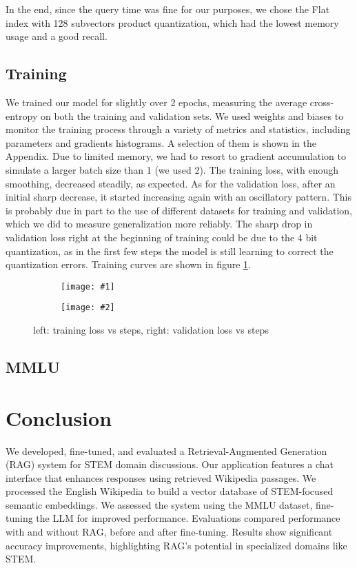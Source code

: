 \documentclass[11pt]{article}
\newcommand{\sideBySideImages}[5]{%
    \begin{figure}[ht]
        \centering
        \begin{subfigure}{#3\linewidth}
            \centering
            \texttt{[image: \#1]}
        \end{subfigure}%
        \hfill%
        \begin{subfigure}{#3\linewidth}
            \centering
            \texttt{[image: \#2]}
        \end{subfigure}
        \caption{#5}
        \label{#4}
    \end{figure}
}
\begin{document}
In the end, since the query time was fine for our purposes, we chose the Flat index with 128
subvectors product quantization, which had the lowest memory usage and a good recall.

\subsection{Training}

We trained our model for slightly over 2 epochs, measuring the average cross-entropy on both the training and validation sets. We used weights
and biases to monitor the training process through a variety of metrics and statistics, including parameters and gradients histograms. A selection of them 
is shown in the Appendix.
Due to limited memory, we had to resort to gradient accumulation to simulate a larger batch size than 1 (we used 2). The training loss, 
with enough smoothing, decreased steadily, as expected. As for the validation loss, after an initial sharp decrease, it started increasing
again with an oscillatory pattern. This is probably due in part to the use of different datasets for training and validation, which we did
to measure generalization more reliably. The sharp drop in validation loss right at the beginning of training could be due to the 4 bit quantization,
as in the first few steps the model is still learning to correct the quantization errors. Training curves are shown in figure \ref{fig:training_curves}.

\sideBySideImages{figures/train-loss.png}{figures/val-loss.png}{0.48}{fig:training_curves}{left: training loss vs steps, right: validation loss vs steps}

\subsection{MMLU}

\section{Conclusion}
We developed, fine-tuned, and evaluated a Retrieval-Augmented Generation (RAG) 
system for STEM domain discussions. Our application features a chat interface 
that enhances responses using retrieved Wikipedia passages. We processed the 
English Wikipedia to build a vector database of STEM-focused semantic 
embeddings. 
We assessed the system using the MMLU 
dataset, fine-tuning the LLM for improved performance. Evaluations compared 
performance with and without RAG, before and after fine-tuning.
Results show significant accuracy improvements, highlighting RAG's potential 
in specialized domains like STEM.
\end{document}
